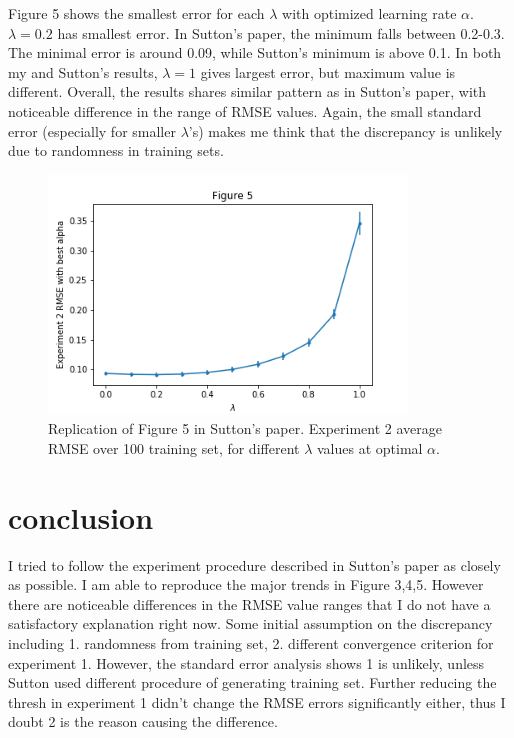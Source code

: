 \documentclass[conference]{IEEEtran}
\begin{document}
	Figure 5 shows the smallest error for each $\lambda$ with optimized learning rate $\alpha$. $\lambda=0.2$ has smallest error. In Sutton's paper, the minimum falls between 0.2-0.3. The minimal error is around 0.09, while Sutton's minimum is above 0.1. In both my and Sutton's results, $\lambda=1$ gives largest error, but maximum value is different. Overall, the results shares similar pattern as in Sutton's paper, with noticeable difference in the range of RMSE values. Again, the small standard error (especially for smaller $\lambda$'s) makes me think that the discrepancy is unlikely due to randomness in training sets.
	
	\begin{figure}
		\includegraphics[height=2.5in]{figure5.png} 
		\caption{Replication of Figure 5 in Sutton's paper. Experiment 2 average RMSE over 100 training set, for different $\lambda$ values at optimal $\alpha$.}
		\label{fig:3}
	\end{figure}
	
\section{conclusion}
I tried to follow the experiment procedure described in Sutton's paper as closely as possible. I am able to reproduce the major trends in Figure 3,4,5. However there are noticeable differences in the RMSE value ranges that I do not have a satisfactory explanation right now. Some initial assumption on the discrepancy including 1. randomness from training set, 2. different convergence criterion for experiment 1. However, the standard error analysis shows 1 is unlikely, unless Sutton used different procedure of generating training set. Further reducing the thresh in experiment 1 didn't change the RMSE errors significantly either, thus I doubt 2 is the reason causing the difference.

	


\end{document}
